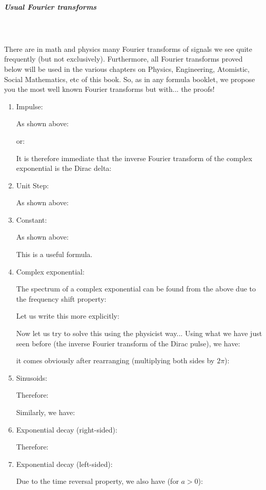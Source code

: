 	\pagebreak
	\subparagraph{Usual Fourier transforms}\label{usual Fourier transforms}\mbox{}\\\\
	There are in math and physics many Fourier transforms of signals we see quite frequently (but not exclusively). Furthermore, all Fourier transforms proved below will be used in the various chapters on Physics, Engineering, Atomistic, Social Mathematics, etc of this book. So, as in any formula booklet, we propose you the most well known Fourier transforms but with... the proofs!
	\begin{enumerate}
	
	\item Impulse:
	
	As shown above:
	
	or:
	
	It is therefore immediate that the inverse Fourier transform of the complex exponential is the Dirac delta:
	
	
	\item Unit Step:
	
	As shown above:
	
	
	\item Constant:
	
	As shown above:
	
	This is a useful formula.
	
	\item Complex exponential:
	
	The spectrum of a complex exponential can be found from the above due to the frequency shift property:
	
	Let us write this more explicitly:
	
	Now let us try to solve this using the physicist way... Using what we have just seen before (the inverse Fourier transform of the Dirac pulse), we have:
	
	it comes obviously after rearranging (multiplying both sides by $2\pi$):
	
	
	\item Sinusoids:
	
	
	Therefore:
	
	Similarly, we have:
	
	
	\item Exponential decay (right-sided):
	
	Therefore:
	
	
	\item Exponential decay (left-sided):
	
	Due to the time reversal property, we also have (for $a>0$):
	

\end{enumerate}
